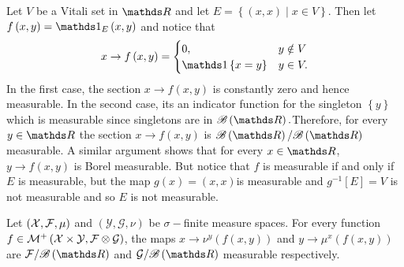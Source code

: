 \begin{example}
\label{exa:sectionMeasurableNotProductMeasurable}Let $V$ be a Vitali
set in $\R$ and let $E=\left\{ \left(x,x\right)\mid x\in V\right\} .$
Then let $f\left(x,y\right)=\indicate_{E}\left(x,y\right)$ and notice
that
\[
x\to f\left(x,y\right)=\begin{cases}
0, & y\notin V\\
\indicate\left\{ x=y\right\}  & y\in V.
\end{cases}
\]
In the first case, the section $x\to f\left(x,y\right)$ is constantly
zero and hence measurable. In the second case, its an indicator function
for the singleton $\left\{ y\right\} $ which is measurable since
singletons are in $\borel\left(\R\right).$Therefore, for every $y\in\R$
the section $x\to f\left(x,y\right)$ is $\borel\left(\R\right)/\borel\left(\R\right)$
measurable. A similar argument shows that for every $x\in\R$, $y\to f\left(x,y\right)$
is Borel measurable. But notice that $f$ is measurable if and only
if $E$ is measurable, but the map $g\left(x\right)=\left(x,x\right)$is
measurable and $g^{-1}\left[E\right]=V$ is not measurable and so
$E$ is not measurable.
\end{example}

\begin{lem}
\label{lem:partialIntegralMeasurability}Let $\left(\mathcal{X},\mathcal{F},\mu\right)$
and $\left(\mathcal{Y},\mathcal{G},\nu\right)$ be $\sigma-$finite
measure spaces. For every function $f\in\mathcal{M}^{+}\left(\mathcal{X}\times\mathcal{Y},\mathcal{F}\otimes\mathcal{G}\right)$,
the maps $x\to\nu^{y}\left(f\left(x,y\right)\right)$ and $y\to\mu^{x}\left(f\left(x,y\right)\right)$
are $\mathcal{F}/\borel\left(\R\right)$ and $\mathcal{G}/\borel\left(\R\right)$
measurable respectively.
\end{lem}

